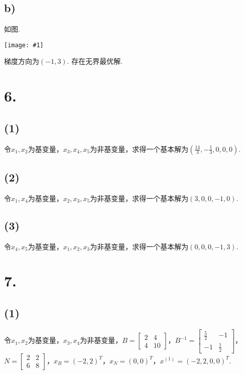 \documentclass{article}
\newcommand{\p}[1]{\texttt{[image: \#1]}}
\begin{document}
	\subsection*{b)}
	
	如图.
	
	\p{5-b}
	
	梯度方向为$(-1,3)$. 存在无界最优解.
	\section*{6.}
	
	\subsection*{(1)}
	
	令$x_1, x_2$为基变量，$x_3, x_4,x_5$为非基变量，求得一个基本解为$(\frac{14}{3},-\frac{1}{3},0,0,0)$.
	
	\subsection*{(2)}
	
	令$x_1, x_4$为基变量，$x_2, x_3,x_5$为非基变量，求得一个基本解为$(3,0,0,-1,0)$.
	
	
	\subsection*{(3)}
	
	令$x_4, x_5$为基变量，$x_1, x_2,x_3$为非基变量，求得一个基本解为$(0,0,0,-1,3)$.
	
	\section*{7.}
	
	\subsection*{(1)}
	
	令$x_1, x_2$为基变量，$x_3, x_4$为非基变量，$B=\begin{bmatrix} 2 & 4 \\ 4 & 10\end{bmatrix}$，$B^{-1}=\begin{bmatrix} \frac{5}{2} & -1 \\ -1 & \frac{1}{2}\end{bmatrix}$，$N=\begin{bmatrix} 2 & 2 \\ 6 & 8\end{bmatrix}$，$x_B=(-2,2)^T$，$x_N=(0,0)^T$，$x^{(1)}=(-2,2,0,0)^T$.
	
\end{document}
